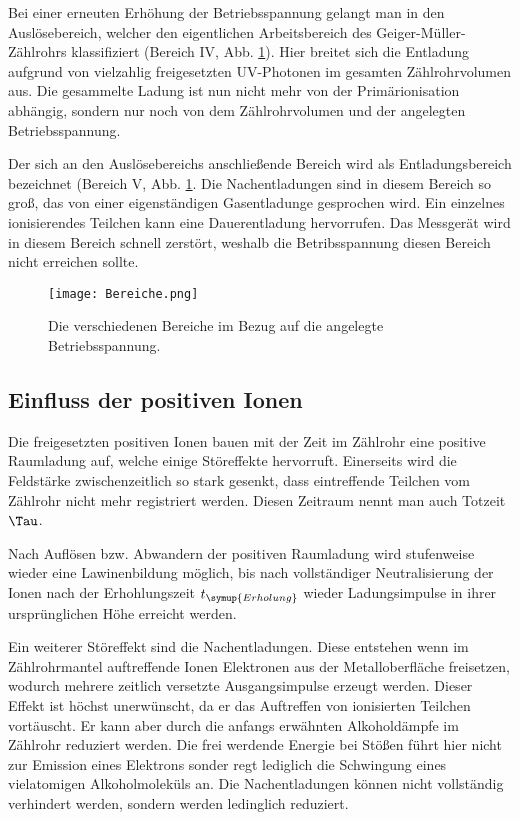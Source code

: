 Bei einer erneuten Erhöhung der Betriebsspannung gelangt man in den Auslösebereich,
welcher den eigentlichen Arbeitsbereich des Geiger-Müller-Zählrohrs klassifiziert
(Bereich IV, Abb. \ref{fig:Bereiche}).
Hier breitet sich die Entladung aufgrund von vielzahlig
freigesetzten UV-Photonen im gesamten Zählrohrvolumen aus. Die gesammelte Ladung
ist nun nicht mehr von der Primärionisation abhängig, sondern nur noch von
dem Zählrohrvolumen und der angelegten Betriebsspannung.

Der sich an den Auslösebereichs anschließende Bereich wird als Entladungsbereich
bezeichnet (Bereich V, Abb. \ref{fig:Bereiche}. Die Nachentladungen sind
in diesem Bereich so groß, das von einer eigenständigen Gasentladunge gesprochen wird.
Ein einzelnes ionisierendes Teilchen kann eine Dauerentladung hervorrufen.
Das Messgerät wird in diesem Bereich schnell zerstört, weshalb die Betribsspannung
diesen Bereich nicht erreichen sollte.

\begin{figure}
  \centering
  \texttt{[image: Bereiche.png]}
  \caption{Die verschiedenen Bereiche im Bezug auf die angelegte Betriebsspannung.}
  \label{fig:Bereiche}
\end{figure}

\subsection{Einfluss der positiven Ionen}

Die freigesetzten positiven Ionen bauen mit der Zeit im Zählrohr eine positive
Raumladung auf, welche einige Störeffekte hervorruft. Einerseits wird die
Feldstärke zwischenzeitlich so stark gesenkt, dass eintreffende Teilchen vom
Zählrohr nicht mehr registriert werden. Diesen Zeitraum nennt man auch Totzeit $\Tau$.

Nach Auflösen bzw. Abwandern der positiven Raumladung wird stufenweise wieder eine
Lawinenbildung möglich, bis nach vollständiger Neutralisierung der Ionen nach der
Erhohlungszeit $t_{\symup{Erholung}}$ wieder Ladungsimpulse in ihrer ursprünglichen Höhe erreicht
werden.

Ein weiterer Störeffekt sind die Nachentladungen. Diese entstehen wenn im Zählrohrmantel
auftreffende Ionen Elektronen aus der Metalloberfläche freisetzen, wodurch mehrere
zeitlich versetzte Ausgangsimpulse erzeugt werden. Dieser Effekt ist höchst unerwünscht,
da er das Auftreffen von ionisierten Teilchen vortäuscht. Er kann aber durch die anfangs
erwähnten Alkoholdämpfe im Zählrohr reduziert werden. Die frei werdende Energie
bei Stößen führt hier nicht zur Emission eines Elektrons sonder regt lediglich
die Schwingung eines vielatomigen Alkoholmoleküls an. Die Nachentladungen
können nicht vollständig verhindert werden, sondern werden ledinglich reduziert.


